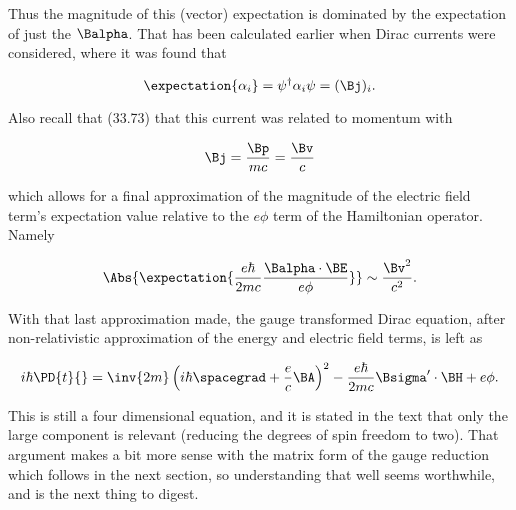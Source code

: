 Thus the magnitude of this (vector) expectation is dominated by the expectation of just the $\Balpha$.  That has been calculated earlier when Dirac currents were considered, where it was found that

\begin{equation}\label{eqn:diracGauge:620}
\expectation{\alpha_i} = \psi^\dagger \alpha_i \psi = (\Bj)_i.
\end{equation}

Also recall that (33.73) that this current was related to momentum with

\begin{equation}\label{eqn:diracGauge:640}
\Bj = \frac{\Bp}{m c} = \frac{\Bv}{c}
\end{equation}

which allows for a final approximation of the magnitude of the electric field term's expectation value relative to the $e\phi$ term of the Hamiltonian operator.  Namely

\begin{equation}\label{eqn:diracGauge:660}
\Abs{ \expectation{ \frac{e \hbar}{ 2 m c} \frac{\Balpha \cdot \BE}{e \phi } } }
\sim
\frac{\Bv^2}{c^2}.
\end{equation}

With that last approximation made, the gauge transformed Dirac equation, after non-relativistic approximation of the energy and electric field terms, is left as

\begin{equation}\label{eqn:diracGauge:680}
i \hbar \PD{t}{}
=
\inv{2m} \left(i \hbar \spacegrad + \frac{e}{c} \BA \right)^2
- \frac{e \hbar}{2 m c} \Bsigma' \cdot \BH
+ e \phi.
\end{equation}

This is still a four dimensional equation, and it is stated in the text that only the large component is relevant (reducing the degrees of spin freedom to two).  That argument makes a bit more sense with the matrix form of the gauge reduction which follows in the next section, so understanding that well seems worthwhile, and is the next thing to digest.

\EndArticle
